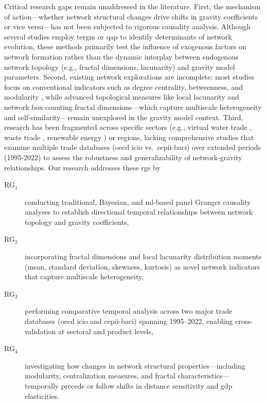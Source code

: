 \documentclass[preprint, 3p,
authoryear]{elsarticle} %
\begin{document}
Critical research gaps remain unaddressed in the literature. First, the
mechanism of action---whether network structural changes drive shifts in
gravity coefficients or vice versa---has not been subjected to rigorous
causality analysis. Although several studies employ \gls{tergm}
\citep{ding2025study, feng2024patterns} or \gls{qap}
\citep{xing2023structural, dong2024spatial} to identify determinants of
network evolution, these methods primarily test the influence of
exogenous factors on network formation rather than the dynamic interplay
between endogenous network topology (e.g., fractal dimensions,
lacunarity) and gravity model parameters. Second, existing network
explorations are incomplete: most studies focus on conventional
indicators such as degree centrality, betweenness, and modularity
\citep{hao2020using, garcia2016international, chen2023complex}, while
advanced topological measures like local lacunarity and network
box-counting fractal dimensions---which capture multiscale heterogeneity
and self-similarity---remain unexplored in the gravity model context.
Third, research has been fragmented across specific sectors (e.g.,
virtual water trade \citep{xing2023structural}, waste trade
\citep{poon2024industrial}, renewable energy \citep{feng2024patterns})
or regions, lacking comprehensive studies that examine multiple trade
databases (\gls{oecd} \gls{icio} vs.~\gls{cepii}-\gls{baci}) over
extended periods (1995-2022) to assess the robustness and
generalizability of network-gravity relationships. Our research
addresses these \glspl{rg} by

\begin{description}
\item[RG$_1$\label{rg1}] conducting traditional, Bayesian, and \gls{ml}-based panel Granger causality analyses to establish directional temporal relationships between network topology and gravity coefficients,
\item[RG$_2$\label{rg2}] incorporating fractal dimensions and local lacunarity distribution moments (mean, standard deviation, skewness, kurtosis) as novel network indicators that capture multiscale heterogeneity,
\item[RG$_3$\label{rg3}] performing comparative temporal analysis across two major trade databases (\gls{oecd} \gls{icio} and \gls{cepii}-\gls{baci}) spanning 1995--2022, enabling cross-validation at sectoral and product levels,
\item[RG$_4$\label{rg4}] investigating how changes in network structural properties---including modularity, centralization measures, and fractal characteristics---temporally precede or follow shifts in distance sensitivity and \gls{gdp} elasticities.
\end{description}
\end{document}
